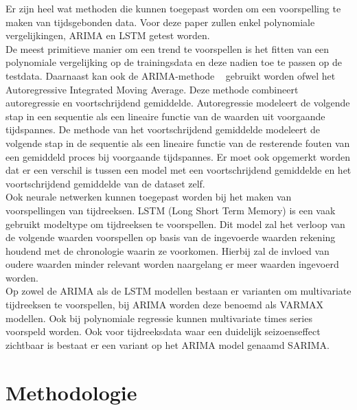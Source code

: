 Er zijn heel wat methoden die kunnen toegepast worden om een voorspelling te maken van tijdsgebonden data. Voor deze paper zullen enkel polynomiale vergelijkingen, ARIMA en LSTM getest worden. \\
De meest primitieve manier om een trend te voorspellen is het fitten van een polynomiale vergelijking op de trainingsdata en deze nadien toe te passen op de testdata. 
Daarnaast kan ook de ARIMA-methode ~\autocite{Brownlee2018} gebruikt worden ofwel het Autoregressive Integrated Moving Average. Deze methode combineert autoregressie en voortschrijdend gemiddelde. Autoregressie modeleert de volgende stap in een sequentie als een lineaire functie van de waarden uit voorgaande tijdspannes. De methode van het voortschrijdend gemiddelde modeleert de volgende stap in de sequentie als een lineaire functie van de resterende fouten van een gemiddeld proces bij voorgaande tijdspannes. Er moet ook opgemerkt worden dat er een verschil is tussen een model met een voortschrijdend gemiddelde en het voortschrijdend gemiddelde van de dataset zelf. \\
Ook neurale netwerken kunnen toegepast worden bij het maken van voorspellingen van tijdreeksen. LSTM (Long Short Term Memory) is een vaak gebruikt modeltype om tijdreeksen te voorspellen. Dit model zal het verloop van de volgende waarden voorspellen op basis van de ingevoerde waarden rekening houdend met de chronologie waarin ze voorkomen. Hierbij zal de invloed van oudere waarden minder relevant worden naargelang er meer waarden ingevoerd worden. \\
Op zowel de ARIMA als de LSTM modellen bestaan er varianten om multivariate tijdreeksen te voorspellen, bij ARIMA worden deze benoemd als VARMAX modellen. Ook bij polynomiale regressie kunnen multivariate times series voorspeld worden.
Ook voor tijdreeksdata waar een duidelijk seizoenseffect zichtbaar is bestaat er een variant op het ARIMA model genaamd SARIMA.
\section{Methodologie}
\label{sec:methodologie}


